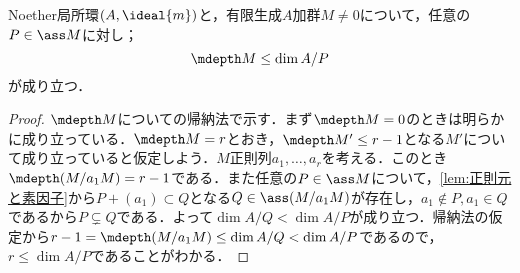 %
%	
%	

\begin{prop}
	Noether局所環$(A,\ideal{m})$と，有限生成$A$加群$M\neq0$について，任意の$P\in\ass M$に対し；
	\[\mdepth M\leq\dim A/P\]
	が成り立つ．
\end{prop}

\begin{proof}
	$\mdepth M$についての帰納法で示す．まず$\mdepth M=0$のときは明らかに成り立っている．$\mdepth M=r$とおき，$\mdepth M'\leq r-1$となる$M'$について成り立っていると仮定しよう．$M$正則列$a_1,\dots,a_r$を考える．このとき$\mdepth (M/a_1M)=r-1$である．また任意の$P\in\ass M$について，\ref{lem:正則元と素因子}から$P+(a_1)\subset Q$となる$Q\in\ass (M/a_1M)$が存在し，$a_1\not\in P,a_1\in Q$であるから$P\subsetneq Q$である．よって$\dim A/Q<\dim A/P$が成り立つ．帰納法の仮定から$r-1=\mdepth (M/a_1M)\leq\dim A/Q<\dim A/P$であるので，$r\leq\dim A/P$であることがわかる． 
\end{proof}

